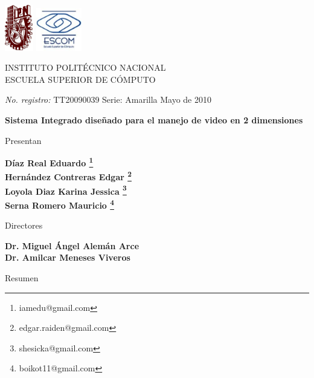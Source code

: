 \cleardoublepage
\begingroup

\begin{addmargin}[-1cm]{-3cm}
\begin{center}

\large

\hfill

\includegraphics[height=2cm]{img/ipn.jpg}
\hfill
\includegraphics[width=2cm]{img/escom.png}

\begingroup
\color{Maroon}
INSTITUTO POLITÉCNICO NACIONAL
\\
ESCUELA SUPERIOR DE CÓMPUTO
\endgroup

\small

\emph{No. registro:} TT20090039 \hfill Serie: Amarilla \hfill Mayo de 2010

\vspace{0.5 cm}

\normalsize

\textbf{Sistema Integrado diseñado para el manejo de video en 2 dimensiones}

\vspace{1.0 cm}

Presentan

\small

\textbf{
Díaz Real Eduardo \footnote{iamedu@gmail.com} \\
Hernández Contreras Edgar \footnote{edgar.raiden@gmail.com} \\
Loyola Diaz Karina Jessica \footnote{shesicka@gmail.com} \\
Serna Romero Mauricio \footnote{boikot11@gmail.com} \\
}

\vspace{0.5 cm}

Directores

\textbf{
Dr. Miguel Ángel Alemán Arce\\
Dr. Amilcar Meneses Viveros
}

\vspace{1.0 cm}

Resumen


\end{center}
\end{addmargin}
